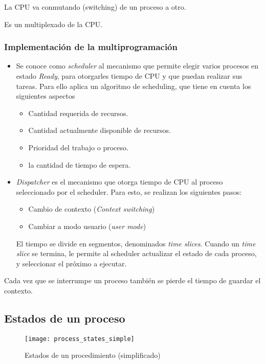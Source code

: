 \documentclass[a4paper, twoside]{article}
\begin{document}
La CPU va conmutando (switching) de un proceso a otro.

Es un multiplexado de la CPU.

\subsubsection{Implementación de la multiprogramación}

\begin{itemize}
  \item Se conoce como \emph{scheduler} al mecanismo que permite elegir varios
  procesos en estado \emph{Ready}, para otorgarles tiempo de CPU y que puedan
  realizar sus tareas. Para ello aplica un algoritmo de scheduling, que tiene
  en cuenta los siguientes aspectos
  \begin{itemize}
    \item Cantidad requerida de recursos.
    \item Cantidad actualmente disponible de recursos.
    \item Prioridad del trabajo o proceso.
    \item la cantidad de tiempo de espera.
  \end{itemize}

  \item \emph{Dispatcher} es el mecanismo que otorga tiempo de CPU al proceso
  seleccionado por el scheduler. Para esto, se realizan los siguientes pasos:
  \begin{itemize}
    \item Cambio de contexto (\emph{Context switching})
    \item Cambiar a modo usuario (\emph{user mode})
  \end{itemize}
  El tiempo se divide en segmentos, denominados \emph{time slices}.
  Cuando un \emph{time slice} se termina, le permite al scheduler actualizar
  el estado de cada proceso, y seleccionar el próximo a ejecutar.
\end{itemize}

Cada vez que se interrumpe un proceso también se pierde el tiempo de guardar
el contexto.

\newpage
\subsection{Estados de un proceso}

\begin{figure}[h]
  \centering
  \texttt{[image: process\_states\_simple]}
  \caption{Estados de un procedimiento (simplificado)}
  \label{fig:process_states_simple}
\end{figure}
\end{document}
